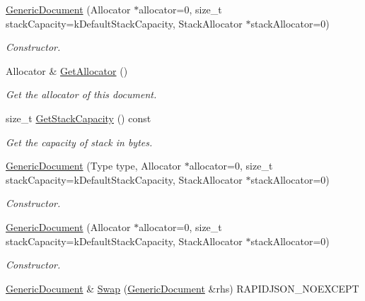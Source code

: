 \begin{DoxyCompactItemize}
\item 
\hyperlink{classGenericDocument_a6b1c313ad538cafc4d23d4bd5f97178c}{Generic\+Document} (Allocator $\ast$allocator=0, size\+\_\+t stack\+Capacity=k\+Default\+Stack\+Capacity, Stack\+Allocator $\ast$stack\+Allocator=0)
\begin{DoxyCompactList}\small\item\em Constructor. \end{DoxyCompactList}\item 
\mbox{\label{classGenericDocument_aa4609d6b19f86aec1a6b96edf2c27686}} 
Allocator \& \hyperlink{classGenericDocument_aa4609d6b19f86aec1a6b96edf2c27686}{Get\+Allocator} ()
\begin{DoxyCompactList}\small\item\em Get the allocator of this document. \end{DoxyCompactList}\item 
\mbox{\label{classGenericDocument_a9e2e543c326b8b981d4f2c3d6793d15b}} 
size\+\_\+t \hyperlink{classGenericDocument_a9e2e543c326b8b981d4f2c3d6793d15b}{Get\+Stack\+Capacity} () const
\begin{DoxyCompactList}\small\item\em Get the capacity of stack in bytes. \end{DoxyCompactList}\item 
\hyperlink{classGenericDocument_a3da21e72ec8f26b9da77d86cc1d41cdd}{Generic\+Document} (Type type, Allocator $\ast$allocator=0, size\+\_\+t stack\+Capacity=k\+Default\+Stack\+Capacity, Stack\+Allocator $\ast$stack\+Allocator=0)
\begin{DoxyCompactList}\small\item\em Constructor. \end{DoxyCompactList}\item 
\hyperlink{classGenericDocument_a6b1c313ad538cafc4d23d4bd5f97178c}{Generic\+Document} (Allocator $\ast$allocator=0, size\+\_\+t stack\+Capacity=k\+Default\+Stack\+Capacity, Stack\+Allocator $\ast$stack\+Allocator=0)
\begin{DoxyCompactList}\small\item\em Constructor. \end{DoxyCompactList}\item 
\hyperlink{classGenericDocument}{Generic\+Document} \& \hyperlink{classGenericDocument_a6290e1290fad74177625af5938c0c58f}{Swap} (\hyperlink{classGenericDocument}{Generic\+Document} \&rhs) R\+A\+P\+I\+D\+J\+S\+O\+N\+\_\+\+N\+O\+E\+X\+C\+E\+PT

\end{DoxyCompactItemize}
